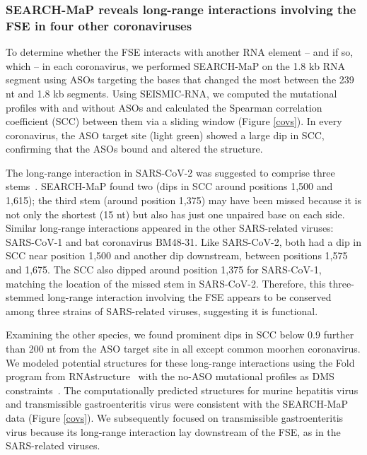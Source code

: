 \documentclass[main.tex]{subfiles}
\begin{document}
\subsubsection{SEARCH-MaP reveals long-range interactions involving the FSE in four other coronaviruses}

To determine whether the FSE interacts with another RNA element -- and if so, which -- in each coronavirus, we performed SEARCH-MaP on the 1.8 kb RNA segment using ASOs targeting the bases that changed the most between the 239 nt and 1.8 kb segments.
Using SEISMIC-RNA, we computed the mutational profiles with and without ASOs and calculated the Spearman correlation coefficient (SCC) between them via a sliding window (Figure \ref{covs}).
In every coronavirus, the ASO target site (light green) showed a large dip in SCC, confirming that the ASOs bound and altered the structure.

The long-range interaction in SARS-CoV-2 was suggested to comprise three stems~\cite{Ziv2020}.
SEARCH-MaP found two (dips in SCC around positions 1,500 and 1,615); the third stem (around position 1,375) may have been missed because it is not only the shortest (15 nt) but also has just one unpaired base on each side.
Similar long-range interactions appeared in the other SARS-related viruses: SARS-CoV-1 and bat coronavirus BM48-31.
Like SARS-CoV-2, both had a dip in SCC near position 1,500 and another dip downstream, between positions 1,575 and 1,675. 
The SCC also dipped around position 1,375 for SARS-CoV-1, matching the location of the missed stem in SARS-CoV-2.
Therefore, this three-stemmed long-range interaction involving the FSE appears to be conserved among three strains of SARS-related viruses, suggesting it is functional.

Examining the other species, we found prominent dips in SCC below 0.9 further than 200 nt from the ASO target site in all except common moorhen coronavirus.
We modeled potential structures for these long-range interactions using the Fold program from RNAstructure~\cite{Mathews2004a} with the no-ASO mutational profiles as DMS constraints~\cite{Cordero2012}.
The computationally predicted structures for murine hepatitis virus and transmissible gastroenteritis virus were consistent with the SEARCH-MaP data (Figure \ref{covs}).
We subsequently focused on transmissible gastroenteritis virus because its long-range interaction lay downstream of the FSE, as in the SARS-related viruses.
\end{document}
